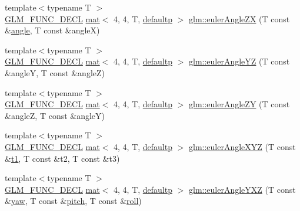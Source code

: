 \begin{DoxyCompactItemize}
\item 
{\footnotesize template$<$typename T $>$ }\\\hyperlink{setup_8hpp_ab2d052de21a70539923e9bcbf6e83a51}{G\+L\+M\+\_\+\+F\+U\+N\+C\+\_\+\+D\+E\+CL} \hyperlink{structglm_1_1mat}{mat}$<$ 4, 4, T, \hyperlink{namespaceglm_a36ed105b07c7746804d7fdc7cc90ff25a9d21ccd8b5a009ec7eb7677befc3bf51}{defaultp} $>$ \hyperlink{group__gtx__euler__angles_ga483903115cd4059228961046a28d69b5}{glm\+::euler\+Angle\+ZX} (T const \&\hyperlink{_s_d_l__opengl__glext_8h_a9e06c1f76a20fed54ca742cd25cb02c4}{angle}, T const \&angleX)
\item 
{\footnotesize template$<$typename T $>$ }\\\hyperlink{setup_8hpp_ab2d052de21a70539923e9bcbf6e83a51}{G\+L\+M\+\_\+\+F\+U\+N\+C\+\_\+\+D\+E\+CL} \hyperlink{structglm_1_1mat}{mat}$<$ 4, 4, T, \hyperlink{namespaceglm_a36ed105b07c7746804d7fdc7cc90ff25a9d21ccd8b5a009ec7eb7677befc3bf51}{defaultp} $>$ \hyperlink{group__gtx__euler__angles_ga220379e10ac8cca55e275f0c9018fed9}{glm\+::euler\+Angle\+YZ} (T const \&angleY, T const \&angleZ)
\item 
{\footnotesize template$<$typename T $>$ }\\\hyperlink{setup_8hpp_ab2d052de21a70539923e9bcbf6e83a51}{G\+L\+M\+\_\+\+F\+U\+N\+C\+\_\+\+D\+E\+CL} \hyperlink{structglm_1_1mat}{mat}$<$ 4, 4, T, \hyperlink{namespaceglm_a36ed105b07c7746804d7fdc7cc90ff25a9d21ccd8b5a009ec7eb7677befc3bf51}{defaultp} $>$ \hyperlink{group__gtx__euler__angles_ga400b2bd5984999efab663f3a68e1d020}{glm\+::euler\+Angle\+ZY} (T const \&angleZ, T const \&angleY)
\item 
{\footnotesize template$<$typename T $>$ }\\\hyperlink{setup_8hpp_ab2d052de21a70539923e9bcbf6e83a51}{G\+L\+M\+\_\+\+F\+U\+N\+C\+\_\+\+D\+E\+CL} \hyperlink{structglm_1_1mat}{mat}$<$ 4, 4, T, \hyperlink{namespaceglm_a36ed105b07c7746804d7fdc7cc90ff25a9d21ccd8b5a009ec7eb7677befc3bf51}{defaultp} $>$ \hyperlink{group__gtx__euler__angles_ga1975e0f0e9bed7f716dc9946da2ab645}{glm\+::euler\+Angle\+X\+YZ} (T const \&\hyperlink{_s_d_l__opengl__glext_8h_af48031a37b713afa3b0d0d7d29653d7c}{t1}, T const \&t2, T const \&t3)
\item 
{\footnotesize template$<$typename T $>$ }\\\hyperlink{setup_8hpp_ab2d052de21a70539923e9bcbf6e83a51}{G\+L\+M\+\_\+\+F\+U\+N\+C\+\_\+\+D\+E\+CL} \hyperlink{structglm_1_1mat}{mat}$<$ 4, 4, T, \hyperlink{namespaceglm_a36ed105b07c7746804d7fdc7cc90ff25a9d21ccd8b5a009ec7eb7677befc3bf51}{defaultp} $>$ \hyperlink{group__gtx__euler__angles_gab8ba99a9814f6d9edf417b6c6d5b0c10}{glm\+::euler\+Angle\+Y\+XZ} (T const \&\hyperlink{group__gtc__quaternion_ga53feffeb4001b99e36e216522e465e9e}{yaw}, T const \&\hyperlink{group__gtc__quaternion_ga9bd78e5fe153d07e39fb4c83e73dba73}{pitch}, T const \&\hyperlink{group__gtc__quaternion_ga3ff93afbd9cc29f2ad217f2228e8a95b}{roll})

\end{DoxyCompactItemize}
